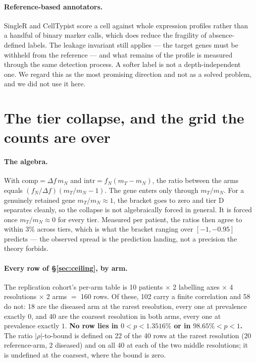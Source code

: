 \paragraph{Reference-based annotators.} SingleR \citep{aran2019}
and CellTypist \citep{dominguezconde2022} score a cell against whole expression
profiles rather than a handful of binary marker calls, which does reduce the
fragility of absence-defined labels. The leakage invariant still applies ---
the target genes must be withheld from the reference --- and what remains of
the profile is measured through the same detection process. A softer label is
not a depth-independent one. We regard this as the most promising direction and
not as a solved problem, and we did not use it here.

\section{The tier collapse, and the grid the counts are over}
\label{app:collapse}

\paragraph{The algebra.} With $\mathrm{comp} = \Delta f\, m_N$ and
$\mathrm{intr} = f_N (m_T - m_N)$, the ratio between the arms equals
$(f_N/\Delta f)(m_T/m_N - 1)$. The gene enters only through $m_T/m_N$. For a
genuinely retained gene $m_T/m_N \approx 1$, the bracket goes to zero and tier D
separates cleanly, so the collapse is not algebraically forced in general. It is
forced once $m_T/m_N \approx 0$ for every tier. Measured per patient, the ratios
then agree to within 3\% across tiers, which is what the bracket ranging over
$[-1, -0.95]$ predicts --- the observed spread is the prediction landing, not a
precision the theory forbids.

\paragraph{Every row of \S\ref{sec:ceiling}, by arm.} The replication cohort's
per-arm table is 10 patients $\times$ 2 labelling axes $\times$ 4 resolutions
$\times$ 2 arms $=$ 160 rows. Of these, 102 carry a finite correlation and 58 do
not: 18 are the diseased arm at the rarest resolution, every one at prevalence
exactly $0$, and 40 are the coarsest resolution in both arms, every one at
prevalence exactly $1$. \textbf{No row lies in $0 < p < 1.3516\%$ or in
$98.65\% < p < 1$.} The ratio $|\rho|$-to-bound is defined on 22 of the 40 rows
at the rarest resolution (20 reference-arm, 2 diseased) and on all 40 at each of
the two middle resolutions; it is undefined at the coarsest, where the bound is
zero.

